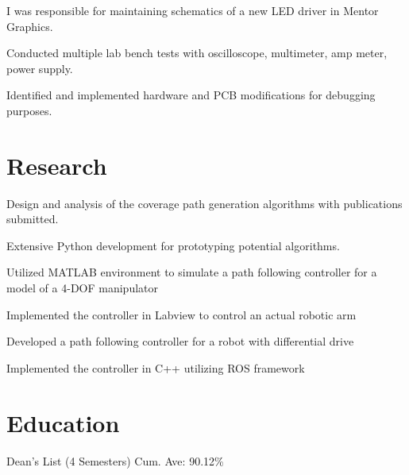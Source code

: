 \documentclass[]{deedy-resume-openfont}
\begin{document}
\begin{tightemize}
\item I was responsible for maintaining schematics of a new LED driver in Mentor Graphics.
\item Conducted multiple lab bench tests with oscilloscope, multimeter, amp meter, power supply.
\item Identified and implemented hardware and PCB modifications for debugging purposes.
\end{tightemize}
\sectionsep



\section{Research}
\begin{tightemize}
\item Design and analysis of the coverage path generation algorithms with publications submitted.
\item Extensive Python development for prototyping potential algorithms.
\end{tightemize}
\sectionsep

\begin{tightemize}
\item Utilized MATLAB environment to simulate a path following controller for a model of a 4-DOF manipulator
\item Implemented the controller in Labview to control an actual robotic arm
\item Developed a path following controller for a robot with differential drive
\item Implemented the controller in C++ utilizing ROS framework
\end{tightemize}
\sectionsep

\section{Education}
\sectionsep

Dean's List (4 Semesters) \textbullet{}
Cum. Ave: 90.12\% \\
\sectionsep
\end{document}
